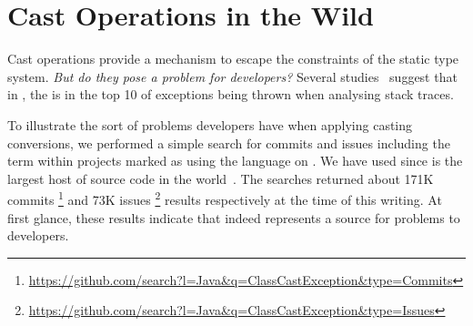 
\chapter{Cast Operations in the Wild}
\label{cha:casts}

Cast operations provide a mechanism to escape the constraints of the static type system.
\emph{But do they pose a problem for developers?}
Several studies~\citep{kechagiaUndocumentedUncheckedExceptions2014,coelhoUnveilingExceptionHandling2015,zhitnitskyTop10Exception2016}
suggest that in \java{},
%
%
the  is in the top 10 of exceptions being thrown when analysing stack traces.

To illustrate the sort of problems developers have when applying casting conversions,
%
%
we performed a simple search for commits and issues including the term  within projects marked as using the \java{} language on \github{}.
We have used \github{} since is the largest host of source code in the world~\citep{gousiosLeanGHTorrentGitHub2014}.
The searches returned about 171K commits%
\footnote{\url{https://github.com/search?l=Java&q=ClassCastException&type=Commits}}
and 73K issues%
\footnote{\url{https://github.com/search?l=Java&q=ClassCastException&type=Issues}}
%
%
results respectively at the time of this writing.
At first glance, these results indicate that  indeed represents a source for problems to developers.






